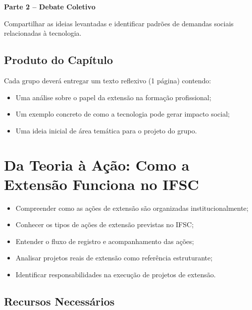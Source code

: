 \documentclass[12pt,a4paper]{article}
\begin{document}
\bigskip

\textbf{Parte 2 – Debate Coletivo}

Compartilhar as ideias levantadas e identificar padrões de demandas sociais relacionadas à tecnologia.

\subsection*{Produto do Capítulo}

Cada grupo deverá entregar um texto reflexivo (1 página) contendo:

\begin{itemize}
    \item Uma análise sobre o papel da extensão na formação profissional;
    \item Um exemplo concreto de como a tecnologia pode gerar impacto social;
    \item Uma ideia inicial de área temática para o projeto do grupo.
\end{itemize}


\newpage

\section{Da Teoria à Ação: Como a Extensão Funciona no IFSC}

\begin{tcolorbox}[boxObjetivos]
\begin{itemize}
    \item Compreender como as ações de extensão são organizadas institucionalmente;
    \item Conhecer os tipos de ações de extensão previstas no IFSC;
    \item Entender o fluxo de registro e acompanhamento das ações;
    \item Analisar projetos reais de extensão como referência estruturante;
    \item Identificar responsabilidades na execução de projetos de extensão.
\end{itemize}
\end{tcolorbox}

\subsection*{Recursos Necessários}
\end{document}
